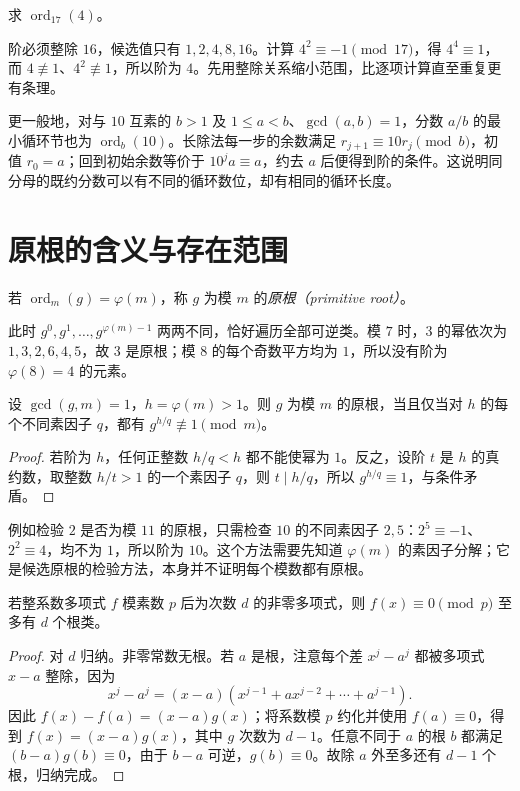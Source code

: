 \begin{example}
求 $\operatorname{ord}_{17}(4)$。
\end{example}
\begin{solve}
阶必须整除 $16$，候选值只有 $1,2,4,8,16$。计算 $4^2\equiv-1\pmod{17}$，得 $4^4\equiv1$，而 $4\not\equiv1$、$4^2\not\equiv1$，所以阶为 $4$。先用整除关系缩小范围，比逐项计算直至重复更有条理。
\end{solve}

更一般地，对与 $10$ 互素的 $b>1$ 及 $1\le a<b$、$\gcd(a,b)=1$，分数 $a/b$ 的最小循环节也为 $\operatorname{ord}_b(10)$。长除法每一步的余数满足 $r_{j+1}\equiv10r_j\pmod b$，初值 $r_0=a$；回到初始余数等价于 $10^ja\equiv a$，约去 $a$ 后便得到阶的条件。这说明同分母的既约分数可以有不同的循环数位，却有相同的循环长度。

\section{原根的含义与存在范围}

\begin{definition}
若 $\operatorname{ord}_m(g)=\varphi(m)$，称 $g$ 为模 $m$ 的\emph{原根（primitive root）}。
\end{definition}

此时 $g^0,g^1,\ldots,g^{\varphi(m)-1}$ 两两不同，恰好遍历全部可逆类。模 $7$ 时，$3$ 的幂依次为 $1,3,2,6,4,5$，故 $3$ 是原根；模 $8$ 的每个奇数平方均为 $1$，所以没有阶为 $\varphi(8)=4$ 的元素。

\begin{proposition}[原根的实用检验]
\label{prop:primitive-root-test}
设 $\gcd(g,m)=1$，$h=\varphi(m)>1$。则 $g$ 为模 $m$ 的原根，当且仅当对 $h$ 的每个不同素因子 $q$，都有 $g^{h/q}\not\equiv1\pmod m$。
\end{proposition}
\begin{proof}
若阶为 $h$，任何正整数 $h/q<h$ 都不能使幂为 $1$。反之，设阶 $t$ 是 $h$ 的真约数，取整数 $h/t>1$ 的一个素因子 $q$，则 $t\mid h/q$，所以 $g^{h/q}\equiv1$，与条件矛盾。
\end{proof}

例如检验 $2$ 是否为模 $11$ 的原根，只需检查 $10$ 的不同素因子 $2,5$：$2^5\equiv-1$、$2^2\equiv4$，均不为 $1$，所以阶为 $10$。这个方法需要先知道 $\varphi(m)$ 的素因子分解；它是候选原根的检验方法，本身并不证明每个模数都有原根。

\begin{lemma}[模素数的根数界]
\label{lem:polynomial-roots}
若整系数多项式 $f$ 模素数 $p$ 后为次数 $d$ 的非零多项式，则 $f(x)\equiv0\pmod p$ 至多有 $d$ 个根类。
\end{lemma}
\begin{proof}
对 $d$ 归纳。非零常数无根。若 $a$ 是根，注意每个差 $x^j-a^j$ 都被多项式 $x-a$ 整除，因为
\[
 x^j-a^j=(x-a)(x^{j-1}+ax^{j-2}+\cdots+a^{j-1}).
\]
因此 $f(x)-f(a)=(x-a)g(x)$；将系数模 $p$ 约化并使用 $f(a)\equiv0$，得到 $f(x)=(x-a)g(x)$，其中 $g$ 次数为 $d-1$。任意不同于 $a$ 的根 $b$ 都满足 $(b-a)g(b)\equiv0$，由于 $b-a$ 可逆，$g(b)\equiv0$。故除 $a$ 外至多还有 $d-1$ 个根，归纳完成。
\end{proof}

